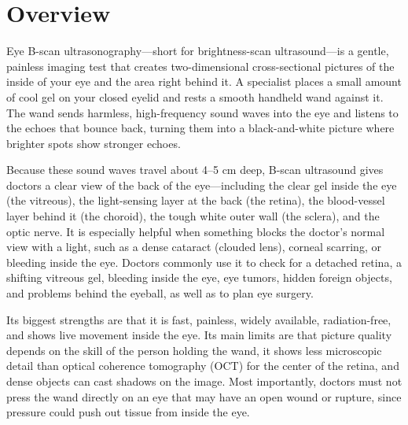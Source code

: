 \label{ch:infographic-bscan}

\section{Overview}

Eye B-scan ultrasonography---short for brightness-scan ultrasound---is a gentle, painless imaging test that creates two-dimensional cross-sectional pictures of the inside of your eye and the area right behind it. A specialist places a small amount of cool gel on your closed eyelid and rests a smooth handheld wand against it. The wand sends harmless, high-frequency sound waves into the eye and listens to the echoes that bounce back, turning them into a black-and-white picture where brighter spots show stronger echoes.

Because these sound waves travel about 4--5 cm deep, B-scan ultrasound gives doctors a clear view of the back of the eye---including the clear gel inside the eye (the vitreous), the light-sensing layer at the back (the retina), the blood-vessel layer behind it (the choroid), the tough white outer wall (the sclera), and the optic nerve. It is especially helpful when something blocks the doctor's normal view with a light, such as a dense cataract (clouded lens), corneal scarring, or bleeding inside the eye. Doctors commonly use it to check for a detached retina, a shifting vitreous gel, bleeding inside the eye, eye tumors, hidden foreign objects, and problems behind the eyeball, as well as to plan eye surgery.

Its biggest strengths are that it is fast, painless, widely available, radiation-free, and shows live movement inside the eye. Its main limits are that picture quality depends on the skill of the person holding the wand, it shows less microscopic detail than optical coherence tomography (OCT) for the center of the retina, and dense objects can cast shadows on the image. Most importantly, doctors must not press the wand directly on an eye that may have an open wound or rupture, since pressure could push out tissue from inside the eye.

